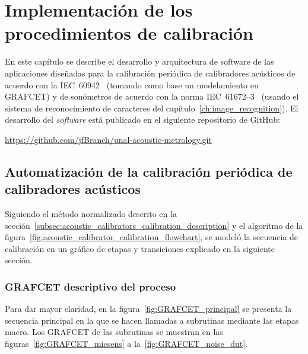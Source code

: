 
\chapter{Implementación de los procedimientos de calibración}

En este capítulo se describe el desarrollo y arquitectura de software de las aplicaciones diseñadas para la calibración periódica de calibradores acústicos de acuerdo con la \mbox{IEC 60942}~\citeyearpar{IEC_TC29_2017} (tomando como base un modelamiento en GRAFCET) y de sonómetros de acuerdo con la norma \mbox{IEC 61672--3}~\citeyearpar{IEC_TC29_2013_1} (usando el sistema de reconocimiento de caracteres del capítulo~\ref{ch:image_recognition}).
El desarrollo del \emph{software} está publicado en el siguiente repositorio de GitHub:

    {\footnotesize\url{https://github.com/jfBranch/unal-acoustic-metrology.git}}


\section{Automatización de la calibración periódica de calibradores acústicos}
\label{sec:acoustic_calibrators_automation}
Siguiendo el método normalizado descrito en la sección~\ref{subsec:acoustic_calibrators_calibration_description} y el algoritmo de la figura~\ref{fig:acoustic_calibrator_calibration_flowchart}, se modeló la secuencia de calibración en un gráfico de etapas y transiciones explicado en la siguiente sección.

\subsection{GRAFCET descriptivo del proceso}
Para dar mayor claridad, en la figura~\ref{fig:GRAFCET_principal} se presenta la secuencia principal en la que se hacen llamadas a subrutinas mediante las etapas macro.
Los GRAFCET de las subrutinas se muestran en las figuras~\ref{fig:GRAFCET_micsens} a la~\ref{fig:GRAFCET_noise_dut}.
\vfill
\clearpage

